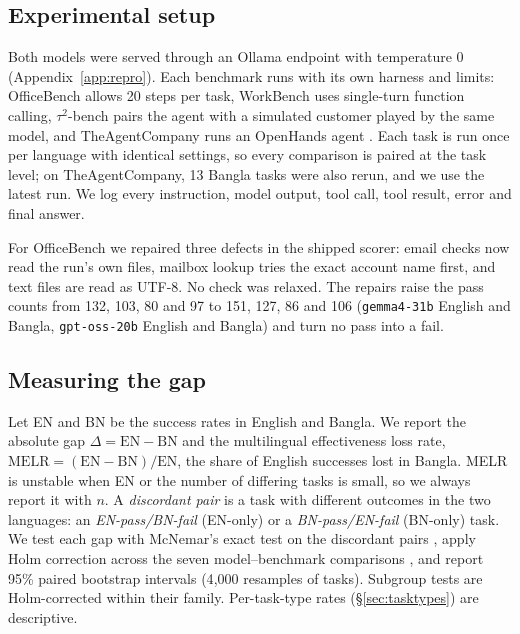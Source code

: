 \documentclass[11pt]{article}
\newif\ifshowverify
\newcommand{\verify}[1]{\ifshowverify{\color{red}\,[VERIFY: #1]}\fi}
\newcommand{\gemma}{\texttt{gemma4-31b}}
\newcommand{\gptoss}{\texttt{gpt-oss-20b}}
\newcommand{\OB}{OfficeBench}
\newcommand{\WB}{WorkBench}
\newcommand{\TAU}{$\tau^2$-bench}
\newcommand{\TAC}{TheAgentCompany}
\begin{document}
\subsection{Experimental setup}
Both models were served through an Ollama endpoint with temperature 0 (Appendix~\ref{app:repro}).
Each benchmark runs with its own harness and limits: \OB{} allows 20 steps per task, \WB{} uses
single-turn function calling, \TAU{} pairs the agent with a simulated customer played by the same
model, and \TAC{} runs an OpenHands agent \verify{100-iteration cap stated in the draft; not in
the sources}. Each task is run once per language with identical settings, so every comparison is
paired at the task level; on \TAC{}, 13 Bangla tasks were also rerun, and we use the latest run.
We log every instruction, model output, tool call, tool result, error and final answer.

For \OB{} we repaired three defects in the shipped scorer: email checks now read the run's own
files, mailbox lookup tries the exact account name first, and text files are read as UTF-8. No
check was relaxed. The repairs raise the pass counts from 132, 103, 80 and 97 to 151, 127, 86 and
106 (\gemma{} English and Bangla, \gptoss{} English and Bangla) and turn no pass into a fail.

\subsection{Measuring the gap}
Let EN and BN be the success rates in English and Bangla. We report the absolute gap
$\Delta = \mathrm{EN} - \mathrm{BN}$ and the multilingual effectiveness loss rate,
$\mathrm{MELR} = (\mathrm{EN}-\mathrm{BN})/\mathrm{EN}$, the share of English successes lost in
Bangla. MELR is unstable when EN or the number of differing tasks is small, so we always report it
with $n$. A \emph{discordant pair} is a task with different outcomes in the two languages: an
\emph{EN-pass/BN-fail} (EN-only) or a \emph{BN-pass/EN-fail} (BN-only) task. We test each gap
with McNemar's exact test on the discordant pairs \citep{mcnemar1947}, apply Holm correction
across the seven model--benchmark comparisons \citep{holm1979}, and report 95\% paired bootstrap
intervals (4{,}000 resamples of tasks). Subgroup tests are Holm-corrected within their family.
Per-task-type rates (\S\ref{sec:tasktypes}) are descriptive.
\end{document}
